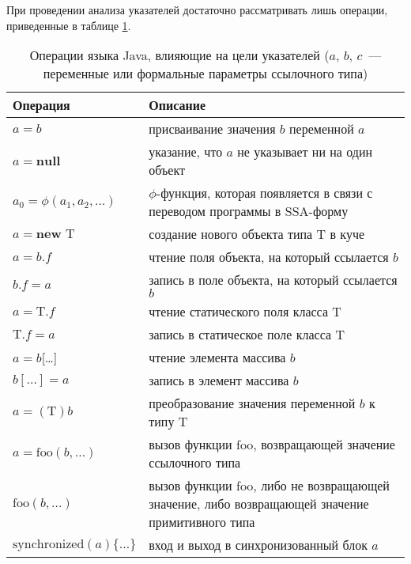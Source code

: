 \documentclass[14pt,titlepage]{extarticle}
\newcommand{\NEW}{\textbf{new }}
\newcommand{\NULL}{\textbf{null }}
\let\oldphi\phi
\renewcommand{\phi}{\ensuremath{\oldphi}}
\begin{document}
      При проведении анализа указателей достаточно рассматривать лишь
      операции, приведенные в таблице \ref{tabular:operations}.

      \begin{table}
        \begin{tabular}{|l|p{120mm}|}\hline
          \textbf{Операция} & \textbf{Описание}\\ \hline

          $a = b$
          & присваивание значения $b$ переменной $a$ \\ \hline

          $a = \NULL$
          & указание, что $a$ не указывает ни на один объект \\ \hline

          $a_0 = \phi(a_1, a_2, \ldots)$
          & \phi-функция, которая появляется в связи с переводом программы в
            SSA-форму \\ \hline

          $a = \NEW \textrm{T}$
          & создание нового объекта типа $\textrm{T}$ в куче \\ \hline

          $a = b.f$
          & чтение поля объекта, на который ссылается $b$ \\ \hline

          $b.f = a$
          & запись в поле объекта, на который ссылается $b$ \\ \hline

          $a = \textrm{T}.f$
          & чтение статического поля класса $\textrm{T}$ \\ \hline

          $\textrm{T}.f = a$
          & запись в статическое поле класса $\textrm{T}$ \\ \hline

          $a = b$[\ldots]
          & чтение элемента массива $b$ \\ \hline

          $b[\ldots] = a$
          & запись в элемент массива $b$ \\ \hline

          $a = (\textrm{T})b$
          & преобразование значения переменной $b$ к типу $\textrm{T}$ \\ \hline

          $a = \textrm{foo}(b, \ldots)$
          & вызов функции foo, возвращающей значение ссылочного типа \\ \hline

          $\textrm{foo}(b, \ldots)$
          & вызов функции foo, либо не возвращающей значение, либо возвращающей
            значение примитивного типа \\ \hline

          $\textrm{synchronized}(a) \{\ldots\}$
          & вход и выход в синхронизованный блок $a$ \\ \hline
        \end{tabular}
        \caption{Операции языка Java, влияющие на цели указателей
                 ($a$, $b$, $c$~--- переменные или формальные параметры
                 ссылочного типа)}
        \label{tabular:operations}
      \end{table}
\end{document}
